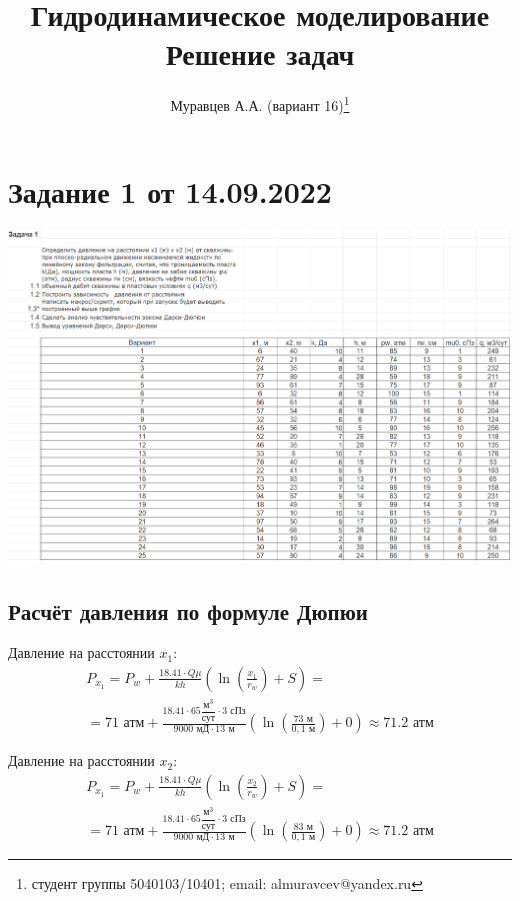 \documentclass[a4paper,12pt]{article}
\begin{document}
\tableofcontents
\title{Гидродинамическое моделирование\\Решение задач}
\author{Муравцев А.А. (вариант 16)\thanks{студент группы 5040103/10401; email: almuravcev@yandex.ru}}
\maketitle


\section{Задание 1 от 14.09.2022}
\includegraphics[width=\textwidth]{task1}


\subsection{Расчёт давления по формуле Дюпюи}

Давление на расстоянии $x_1$:
\begin{multline}
P_{x_1}=P_w+\frac{18.41\cdot Q\mu}{kh}\left(\ln{\left(\frac{x_1}{r_w}\right)+S}\right)
=\\=71\text{ атм}+\frac{18.41\cdot 65\dfrac{\text{м}^3}{\text{сут}}\cdot3\text{ сПз}}{9000\text{ мД}\cdot 13\text{ м}}\left(\ln{\left(\frac{73\text{ м}}{0,1\text{ м}}\right)}+0\right)\approx 71.2\text{ атм}
\end{multline}

Давление на расстоянии $x_2$:
\begin{multline}
P_{x_1}=P_w+\frac{18.41\cdot Q\mu}{kh}\left(\ln{\left(\frac{x_2}{r_w}\right)+S}\right)
=\\=71\text{ атм}+\frac{18.41\cdot 65\dfrac{\text{м}^3}{\text{сут}}\cdot3\text{ сПз}}{9000\text{ мД}\cdot 13\text{ м}}\left(\ln{\left(\frac{83\text{ м}}{0,1\text{ м}}\right)}+0\right)\approx 71.2\text{ атм}
\end{multline}
\end{document}
